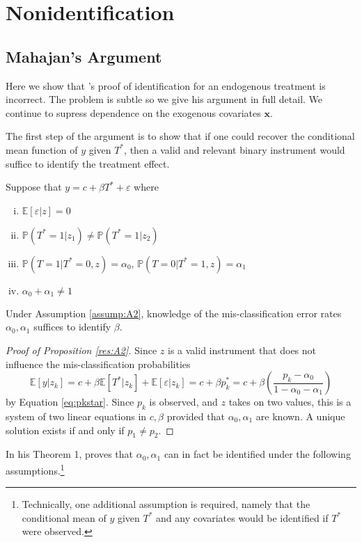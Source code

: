 \section{Nonidentification}

\subsection{Mahajan's Argument}
Here we show that \citeauthor{Mahajan}'s proof of identification for an endogenous treatment is incorrect.
The problem is subtle so we give his argument in full detail.
We continue to supress dependence on the exogenous covariates $\mathbf{x}$.

The first step of the argument is to show that if one could recover the conditional mean function of $y$ given $T^*$, then a valid and relevant binary instrument would suffice to identify the treatment effect.  
\begin{assump}[Mahajan A2]\mbox{}
  \label{assump:A2} Suppose that $y = c+ \beta T^* + \varepsilon$ where
  \begin{enumerate}[(i)]
    \item $\mathbb{E}[\varepsilon|z]=0$
    \item $\mathbb{P}(T^*=1|z_1)\neq \mathbb{P}(T^*=1|z_2)$
    \item $\mathbb{P}(T = 1| T^* = 0, z) = \alpha_0$, $\mathbb{P}(T = 0| T^* = 1, z) = \alpha_1$
    \item $\alpha_0 + \alpha_1 \neq 1$
  \end{enumerate}
\end{assump}

\begin{res}[Mahajan A2]
  \label{res:A2}
Under Assumption \ref{assump:A2}, knowledge of the mis-classification error rates $\alpha_0, \alpha_1$ suffices to identify $\beta$.
\end{res}
\begin{proof}[Proof of Proposition \ref{res:A2}]
Since $z$ is a valid instrument that does not influence the mis-classification probabilities
\[\mathbb{E}[y|z_k] = c + \beta \mathbb{E}[T^*|z_k] + \mathbb{E}[\varepsilon|z_k] = c + \beta p_k^* = c + \beta \left( \frac{p_k - \alpha_0}{1 - \alpha_0 - \alpha_1} \right)\]
by Equation \ref{eq:pkstar}.
Since $p_k$ is observed, and $z$ takes on two values, this is a system of two linear equations in $c,\beta$ provided that $\alpha_0,\alpha_1$ are known.
A unique solution exists if and only if $p_1 \neq p_2$.
\end{proof}
In his Theorem 1, \cite{Mahajan} proves that $\alpha_0, \alpha_1$ can in fact be identified under the following assumptions.\footnote{Technically, one additional assumption is required, namely that the conditional mean of $y$ given $T^*$ and any covariates would be identified if $T^*$ were observed.}

